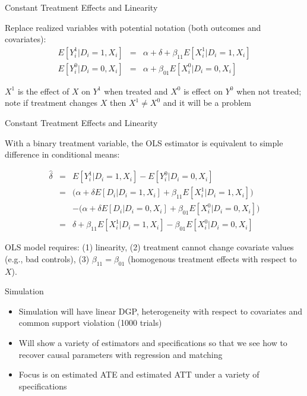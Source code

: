 \documentclass{beamer}
\begin{document}
\begin{frame}{Constant Treatment Effects and Linearity}

Replace realized variables with potential notation (both outcomes and covariates):
\begin{eqnarray*}
E[Y^1_i | D_i = 1,X_i] &=& \alpha + \delta + \beta_{11} E[X^1_i | D_i=1, X_i] \\
E[Y^0_i | D_i = 0,X_i] &=& \alpha + \beta_{01} E[X^0_i | D_i=0, X_i] 
\end{eqnarray*}

\bigskip

$X^1$ is the effect of $X$ on $Y^1$ when treated and $X^0$ is effect on $Y^0$ when not treated; note if treatment changes $X$ then $X^1 \neq X^0$ and it will be a problem


\end{frame}


\begin{frame}{Constant Treatment Effects and Linearity}

With a binary treatment variable, the OLS estimator is equivalent to simple difference in conditional means:

\begin{eqnarray*}
\widehat{\delta} &=& E[Y^1_i | D_i = 1, X_i]  - E[Y^0_i | D_i = 0, X_i]  \\
 &=& \bigg (\alpha + \delta E[D_i | D_i=1, X_i] + \beta_{11} E[X^1_i | D_i=1, X_i] \bigg ) \\
&& - \bigg (\alpha + \delta E[D_i | D_i = 0, X_i] + \beta_{01} E[X^0_i | D_i = 0, X_i] \bigg ) \\
&=& \delta + \beta_{11} E[X^1_i | D_i =1, X_i] - \beta_{01} E[X^0_i | D_i = 0, X_i] 
\end{eqnarray*}

\bigskip

OLS model requires: (1) linearity, (2)  treatment cannot change covariate values (e.g., bad controls), (3) $\beta_{11}=\beta_{01}$ (homogenous treatment effects with respect to $X$).  

\end{frame}

\begin{frame}{Simulation}

\begin{itemize}

\item Simulation will have linear DGP, heterogeneity with respect to covariates and common support violation (1000 trials)
\item Will show a variety of estimators and specifications so that we see how to recover causal parameters with regression and matching
\item Focus is on estimated ATE and estimated ATT under a variety of specifications
\end{itemize}

\end{frame}
\end{document}
